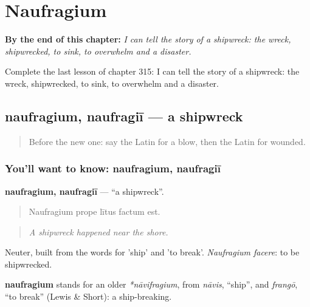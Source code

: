 
\chapter{Naufragium}
\label{ch:la-naufragium}

\begin{chapteropening}
\textbf{By the end of this chapter:} \emph{I can tell the story of a shipwreck: the wreck, shipwrecked, to sink, to overwhelm and a disaster.}

Complete the last lesson of chapter 315: I can tell the story of a shipwreck: the wreck, shipwrecked, to sink, to overwhelm and a disaster.
\end{chapteropening}

\section[naufragium, naufragiī]{naufragium, naufragiī — a shipwreck}

\label{lesson:LA-C315-naufragium}



\begin{quote}
Before the new one: say the Latin for a blow, then the Latin for wounded.
\end{quote}

\subsection*{You'll want to know: naufragium, naufragiī}
\textbf{naufragium, naufragiī} — \textquotedblleft{}a shipwreck\textquotedblright{}.

\begin{quote}
Naufragium prope lītus factum est.
\end{quote}

\begin{quote}
\emph{A shipwreck happened near the shore.}
\end{quote}

Neuter, built from the words for 'ship' and 'to break'. \emph{Naufragium facere}: to be shipwrecked.

\begin{cousinweb}
\textbf{naufragium} stands for an older \emph{*nāvifragium}, from \emph{nāvis}, \textquotedblleft{}ship\textquotedblright{}, and \emph{frangō}, \textquotedblleft{}to break\textquotedblright{} (Lewis \& Short): a ship-breaking.
\end{cousinweb}

